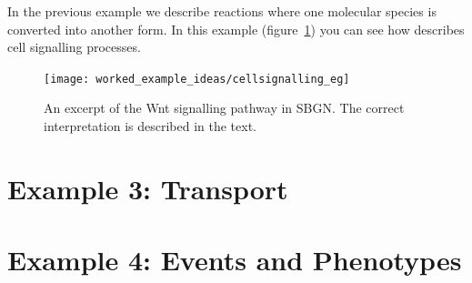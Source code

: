 In the previous example we describe reactions where one molecular
species is converted into another form. In this example
(figure~\ref{fig:weg2}) you can see how \PD describes cell signalling
processes. 

\begin{figure}[htb]
\texttt{[image: worked\_example\_ideas/cellsignalling\_eg]}
\caption{An excerpt of the Wnt signalling pathway in SBGN. The
  correct interpretation is described in the text.}
\label{fig:weg2}
\end{figure}


\section{Example 3: Transport}


\section{Example 4: Events and Phenotypes}

